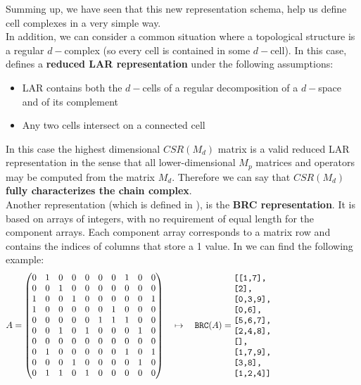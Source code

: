Summing up, we have seen that this new representation schema, help us define cell complexes in a very simple way.\\

In addition, we can consider a common situation where a topological structure is a regular $d-$complex (so every cell is contained in some $d-$cell). In this case, \cite{DiCarlo} defines a \textbf{reduced LAR representation} under the following assumptions:
\begin{itemize}
 \item LAR contains both the $d-$cells of a regular decomposition of a $d-$space and of its complement
 \item Any two cells intersect on a connected cell
\end{itemize}

In this case the highest dimensional $CSR(M_d)$ matrix is a valid reduced LAR representation in the sense that all lower-dimensional $M_p$ matrices and operators may be computed from the matrix $M_d$. Therefore we can say that $CSR(M_d)$ \textbf{fully characterizes the chain complex}.\\

Another representation (which is defined in \cite{cclar}), is the \textbf{BRC representation}. It is based on arrays of integers, with no requirement of equal length for the component arrays. Each component array corresponds to a matrix row and contains the indices of columns that store a 1 value. In \cite{cclar} we can find the following example:
\[
A = \begin{pmatrix}
0 & 1 & 0 & 0 & 0 & 0 & 0 & 1 & 0 & 0\\
0 & 0 & 1 & 0 & 0 & 0 & 0 & 0 & 0 & 0\\
1 & 0 & 0 & 1 & 0 & 0 & 0 & 0 & 0 & 1\\
1 & 0 & 0 & 0 & 0 & 0 & 1 & 0 & 0 & 0\\
0 & 0 & 0 & 0 & 0 & 1 & 1 & 1 & 0 & 0\\
0 & 0 & 1 & 0 & 1 & 0 & 0 & 0 & 1 & 0\\
0 & 0 & 0 & 0 & 0 & 0 & 0 & 0 & 0 & 0\\
0 & 1 & 0 & 0 & 0 & 0 & 0 & 1 & 0 & 1\\
0 & 0 & 0 & 1 & 0 & 0 & 0 & 0 & 1 & 0\\
0 & 1 & 1 & 0 & 1 & 0 & 0 & 0 & 0 & 0\\
\end{pmatrix}
\quad\mapsto\quad \texttt{BRC}(A) =
\begin{minipage}[c]{5cm}
\begin{verbatim}
[[1,7],
 [2],
 [0,3,9],
 [0,6],
 [5,6,7],
 [2,4,8],
 [],
 [1,7,9],
 [3,8],
 [1,2,4]]
\end{verbatim}
\end{minipage}
\]

